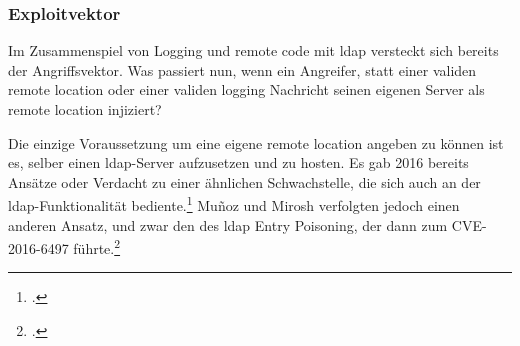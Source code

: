 \subsubsection{Exploitvektor}
Im Zusammenspiel von Logging und remote code mit \gls{ldap} versteckt sich bereits der Angriffsvektor.
Was passiert nun, wenn ein Angreifer, statt einer validen remote location oder einer validen logging Nachricht seinen eigenen Server als remote location injiziert?

Die einzige Voraussetzung um eine eigene remote location angeben zu können ist es, selber einen \gls{ldap}-Server aufzusetzen und zu hosten.
Es gab 2016 bereits Ansätze oder Verdacht zu einer ähnlichen Schwachstelle, die sich auch an der \gls{ldap}-Funktionalität bediente.\footcite{blackhatPresentation}
Muñoz und Mirosh verfolgten jedoch einen anderen Ansatz, und zwar den des \gls{ldap} Entry Poisoning, der dann zum CVE-2016-6497 führte.\footcite{cve2016}
